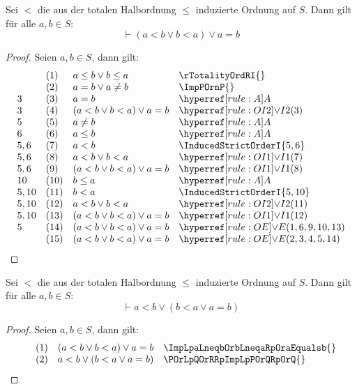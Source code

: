 \documentclass[main.tex]{subfiles}
\begin{document}
\label{ImpLpaLneqbOrbLneqaRpOraEqualsb}
\begin{theorem}[\(\vdash (a<b\lor b<a)\lor a=b\)]
    Sei \(<\) die aus der totalen Halbordnung \(\leq\) induzierte Ordnung auf \(S\). Dann gilt für alle \(a,b\in S\):
    \[
    \vdash (a<b\lor b<a)\lor a=b
    \]
\end{theorem}
\begin{proof}
        Seien \(a,b\in S\), dann gilt:
	\[
        \begin{array}{llll}
            & (1) & a\leq b\lor b\leq a & \rTotalityOrdRI{} \\
            & (2) & a=b\lor a\neq b & \ImpPOrnP{} \\
          3 & (3) & a=b & \rA \\
          3 & (4) & (a<b\lor b<a)\lor a=b & \rOIb{3} \\
          5 & (5) & a\neq b & \rA \\
          6 & (6) & a\leq b & \rA \\
          5,6 & (7) & a<b & \InducedStrictOrderI{5,6} \\
          5,6 & (8) & a<b\lor b<a  & \rOIa{7} \\
          5,6 & (9) & (a<b\lor b<a)\lor a=b  & \rOIa{8} \\
          10 & (10) & b\leq a  & \rA \\
          5,10 & (11) & b<a  & \InducedStrictOrderI{5,10} \\
          5,10 & (12) & a<b\lor b<a  & \rOIb{11} \\
          5,10 & (13) & (a<b\lor b<a)\lor a=b  & \rOIa{12} \\
          5    & (14) & (a<b\lor b<a)\lor a=b  & \rOE{1,6,9,10,13} \\
               & (15) & (a<b\lor b<a)\lor a=b  & \rOE{2,3,4,5,14} \\
        \end{array}
	\]
\end{proof}

\label{aLneqbOrLpbLneqaOraEqualsbRp}
\begin{theorem}[\(\vdash a<b\lor (b<a\lor a=b)\)]
    Sei \(<\) die aus der totalen Halbordnung \(\leq\) induzierte Ordnung auf \(S\). Dann gilt für alle \(a,b\in S\):
    \[
    \vdash a<b\lor (b<a\lor a=b)
    \]
\end{theorem}
\begin{proof}
        Seien \(a,b\in S\), dann gilt:
	\[
        \begin{array}{llll}
            & (1) & (a<b\lor b<a)\lor a=b & \ImpLpaLneqbOrbLneqaRpOraEqualsb{} \\
            & (2) & a<b\lor (b<a\lor a=b) & \POrLpQOrRRpImpLpPOrQRpOrQ{} \\
        \end{array}
	\]
\end{proof}
\end{document}
